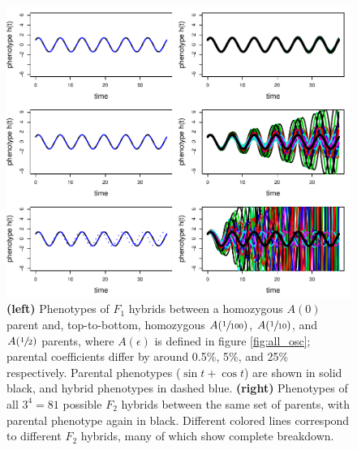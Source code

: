 \documentclass{article}
\newcommand{\1}{\mathbbm{1}}
\begin{document}
\begin{figure}[H]
  \centering
  \includegraphics{examples/f1f2_small}
  \caption{
    \textbf{(left)} Phenotypes of $F_1$ hybrids between a homozygous $A(0)$ parent and, 
    top-to-bottom, homozygous $A(\sfrac{1}{100})$, $A(\sfrac{1}{10})$, and $A(\sfrac{1}{2})$ parents,
    where $A(\epsilon)$ is defined in figure \ref{fig:all_osc};
    parental coefficients differ by around 0.5\%, 5\%, and 25\% respectively.
    Parental phenotypes ($\sin t + \cos t$) are shown in solid black, and hybrid phenotypes in dashed blue.
    \textbf{(right)} Phenotypes of all $3^4 = 81$ possible $F_2$ hybrids between the same set of parents,
    with parental phenotype again in black.
    Different colored lines correspond to different $F_2$ hybrids,
    many of which show complete breakdown.
  } \label{fig:hybs}
\end{figure}
\end{document}
